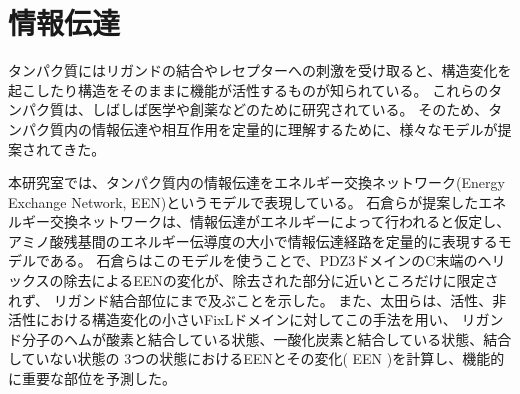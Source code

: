 
\section{情報伝達}
タンパク質にはリガンドの結合やレセプターへの刺激を受け取ると、構造変化を起こしたり構造をそのままに機能が活性するものが知られている。
これらのタンパク質は、しばしば医学や創薬などのために研究されている。
そのため、タンパク質内の情報伝達や相互作用を定量的に理解するために、様々なモデルが提案されてきた。%

本研究室では、タンパク質内の情報伝達をエネルギー交換ネットワーク(Energy Exchange Network, EEN)というモデルで表現している。
石倉らが提案したエネルギー交換ネットワークは、情報伝達がエネルギーによって行われると仮定し、
アミノ酸残基間のエネルギー伝導度の大小で情報伝達経路を定量的に表現するモデルである。\autocite{ishikura_energy_2015}
石倉らはこのモデルを使うことで、PDZ3ドメインのC末端の\alpha ヘリックスの除去によるEENの変化が、除去された部分に近いところだけに限定されず、
リガンド結合部位にまで及ぶこと\autocite{ishikura_energy_2015}を示した。
また、太田らは、活性、非活性における構造変化の小さいFixLドメインに対してこの手法を用い、
リガンド分子のヘムが酸素と結合している状態、一酸化炭素と結合している状態、結合していない状態の
3つの状態におけるEENとその変化( \Delta EEN )を計算し、機能的に重要な部位を予測した。\autocite{ota_energy_2019}

